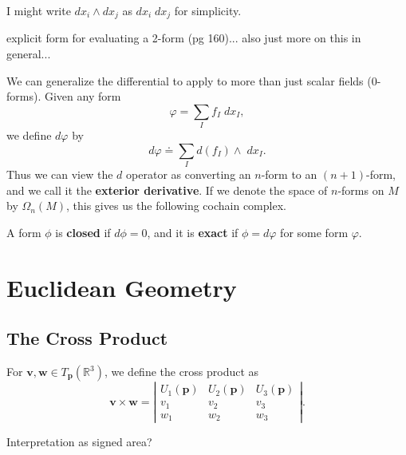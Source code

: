 \documentclass[10pt]{report}
\begin{document}
\begin{note}
I might write $dx_i \wedge dx_j$ as $dx_i\;dx_j$ for simplicity.
\end{note}

{\color{red}explicit form for evaluating a 2-form (pg 160)... also just more on this in general...}

We can generalize the differential to apply to more than just scalar fields (0-forms). Given any form
\[
\varphi = \sum_{I} f_I \;dx_I,
\] we define $d\varphi$ by
\[
	d\varphi \doteq \sum_{I} d(f_I)\wedge \;dx_I.
\] 
Thus we can view the $d$ operator as converting an $n$-form to an $(n+1)$-form, and we call it the \textbf{exterior derivative}. If we denote the space of $n$-forms on $M$ by $\Omega_n(M)$, this gives us the following cochain complex.
\begin{figure}[H]
	\centering
{}
\end{figure}
A form $\phi$ is \textbf{closed} if $d\phi=0$, and it is \textbf{exact} if $\phi = d\varphi$ for some form $\varphi$.


\chapter{Euclidean Geometry}


\section{The Cross Product}

For $\mathbf{v}, \mathbf{w} \in T_{\mathbf{p}}(\mathbb{R}^3)$, we define the cross product as
\[
\mathbf{v} \times \mathbf{w} = \left| 
\begin{matrix}
	U_1(\mathbf{p}) & U_2(\mathbf{p}) & U_3(\mathbf{p}) \\
	v_1 & v_2 & v_3 \\
	w_1 & w_2 & w_3
\end{matrix}\right|.
\] 

{\color{red}Interpretation as signed area?}
\end{document}

